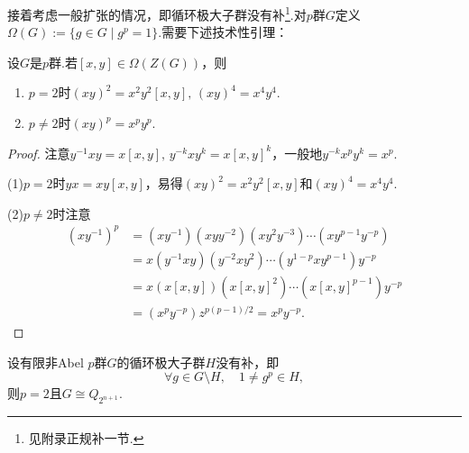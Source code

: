 接着考虑一般扩张的情况，即循环极大子群没有补\footnote{见附录正规补一节.}.对$p$群$G$定义$\Omega(G):=\{g\in G\mid g^p=1\}$.需要下述技术性引理：%
\begin{lemma}
	设$G$是$p$群.若$[x,y]\in\Omega(Z(G))$，则
	\begin{enumerate}
		\item $p=2$时$(xy)^2=x^2y^2[x,y],\,(xy)^4=x^4y^4$.
		\item $p\ne 2$时$(xy)^p=x^py^p$.
	\end{enumerate}
\end{lemma}
\begin{proof}
	注意$y^{-1}xy=x[x,y],\,y^{-k}xy^k=x[x,y]^k$，一般地$y^{-k}x^py^k=x^p$.

	(1)$p=2$时$yx=xy[x,y]$，易得$(xy)^2=x^2y^2[x,y]$和$(xy)^4=x^4y^4$.

	(2)$p\ne 2$时注意
	\begin{align*}
		(xy^{-1})^p&=(xy^{-1})(xyy^{-2})(xy^2y^{-3})\cdots(xy^{p-1}y^{-p})\\
		&=x(y^{-1}xy)(y^{-2}xy^2)\cdots(y^{1-p}xy^{p-1})y^{-p}\\
		&=x(x[x,y])(x[x,y]^2)\cdots(x[x,y]^{p-1})y^{-p}\\
		&=(x^py^{-p})z^{p(p-1)/2}=x^py^{-p}.
	\end{align*}
\end{proof}
\begin{prop}
	设有限非Abel $p$群$G$的循环极大子群$H$没有补，即
	\[
		\forall g\in G\setminus H,\quad 1\ne g^p\in H,
	\]
	则$p=2$且$G\cong Q_{2^{n+1}}$.\hypertarget{prop:pGroupCyclicMax2}{}
\end{prop}

